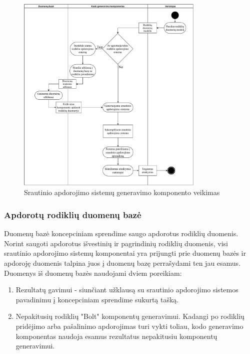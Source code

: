 \documentclass{VUMIFPSbakalaurinis}
\begin{document}
\begin{figure}[H]
    \centering
    \includegraphics[width=0.8\textwidth]{img/generation-flow.pdf}
    \caption{Srautinio apdorojimo sistemų generavimo komponento veikimas}
    \label{img:generation-flow}
\end{figure}

\subsubsection{Apdorotų rodiklių duomenų bazė}

Duomenų bazė koncepciniam sprendime saugo apdorotus rodiklių duomenis. Norint saugoti apdorotus išvestinių ir pagrindinių rodiklių duomenis, visi srautinio apdorojimo sistemų komponentai yra prijungti prie duomenų bazės ir apdoroję duomenis talpina juos į duomenų bazę perrašydami ten jau esamus. Duomenys iš duomenų bazės naudojami dviem poreikiam: 
\begin{enumerate}
    \item Rezultatų gavimui - siunčiant užklausą su srautinio apdorojimo sistemos pavadinimu į koncepciniam sprendime sukurtą tašką. 
    \item Nepakitusių rodiklių "Bolt" komponentų generavimui. Kadangi po rodiklių pridėjimo arba pašalinimo apdorojimas turi vykti toliau, kodo generavimo komponentas naudoja esamus rezultatus nepakitusiu komponentų generavimui.   
\end{enumerate}  
\end{document}
